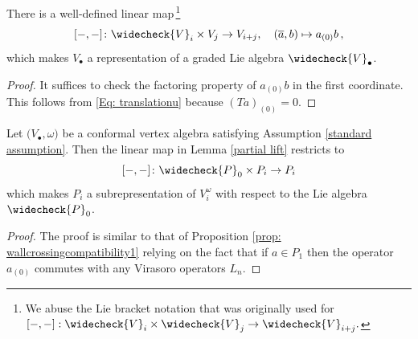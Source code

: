 \documentclass[a4paper, 12pt]{amsart}
\begin{document}
\begin{lemma}\label{partial lift}
There is a well-defined linear map\,\footnote{We abuse the Lie bracket notation that was originally used for $[-,-]:\widecheck{V}_i\times \widecheck{V}_j\rightarrow \widecheck{V}_{i+j}.$}
\begin{equation}
\label{Eq: liftofLie}[-,-]\colon \widecheck{V}_{i}\times V_{j}\rightarrow V_{i+j},\quad (\overline{a},b)\mapsto a_{(0)}b\,,
\end{equation}
which makes $V_\bullet$ a representation of a graded Lie algebra $\widecheck{V}_\bullet$. 
\end{lemma}
\begin{proof}
It suffices to check the factoring property of $a_{(0)}b$ in the first coordinate. This follows from \eqref{Eq: translationu} because $(Ta)_{(0)}=0$.
\end{proof}

\begin{proposition}\label{prop: wallcrossingcompatibility2}
Let $\big(V_\bullet,\omega\big)$ be a conformal vertex algebra satisfying Assumption \ref{standard assumption}. Then the linear map in Lemma \ref{partial lift} restricts to 
$$[-,-]\colon\widecheck{P}_0\times P_i\rightarrow P_i 
$$
which makes $P_i$ a subrepresentation of $V_i^\omega$ with respect to the Lie algebra $\widecheck{P}_0$. 
\end{proposition}
\begin{proof}
The proof is similar to that of Proposition \ref{prop: wallcrossingcompatibility1} relying on the fact that if $a\in P_1$ then the operator $a_{(0)}$ commutes with any Virasoro operators $L_n$.
\end{proof}
\end{document}
